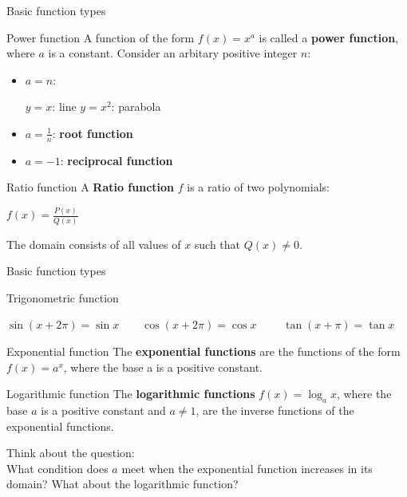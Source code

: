 \begin{frame}{Basic function types}
    \begin{block}{Power function}
        A function of the form $f(x)=x^a$ is called a \textbf{power function}, where $a$ is a constant. Consider an arbitary positive integer $n$:
        \begin{itemize}
            \item $a=n$:\\
                  \begin{center}
                      $y=x$: line \qquad $y=x^2$: parabola
                  \end{center}
            \item $a=\frac{1}{n}$: \textbf{root function}\\
            \item $a=-1$: \textbf{reciprocal function}
        \end{itemize}
    \end{block}
    \begin{block}{Ratio function}
        A \textbf{Ratio function} $f$ is a ratio of two polynomials:
        \begin{center}
            $f(x)=\frac{P(x)}{Q(x)}$
        \end{center}
        The domain consists of all values of $x$ such that $Q(x)\neq 0$.
    \end{block}
\end{frame}

\begin{frame}{Basic function types}
    \begin{block}{Trigonometric function}
        \begin{center}
            $\sin (x+2\pi)=\sin x\qquad \cos (x+2\pi)=\cos x\qquad $
            $\tan (x+\pi)=\tan x$
        \end{center}
    \end{block}
    \begin{block}{Exponential function}
        The \textbf{exponential functions} are the functions of the form $f(x) = a^x$, where the base a is a positive constant.
    \end{block}
    \begin{block}{Logarithmic function}
        The \textbf{logarithmic functions} $f(x) = \log_ax$, where the base $a$ is a positive constant and $a\neq 1$, are the inverse functions of the exponential functions.
    \end{block}
    Think about the question:\\
    What condition does $a$ meet when the exponential function increases in its domain? What about the logarithmic function?
\end{frame}

